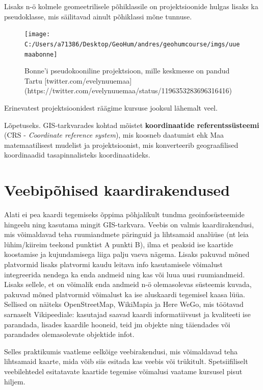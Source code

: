 \documentclass[
]{book}
\begin{document}
Lisaks n-ö kolmele geomeetrilisele põhiklassile on projektsioonide hulgas lisaks ka pseudoklasse, mis säilitavad ainult põhiklassi mõne tunnuse.

\begin{figure}

{\centering \texttt{[image: C:/Users/a71386/Desktop/GeoHum/andres/geohumcourse/imgs/uuemaabonne]} 

}

\caption{Bonne'i pseudokooniline projektsioon, mille keskmesse on pandud Tartu [twitter.com/evelynuuemaa](https://twitter.com/evelynuuemaa/status/1196353283696316416)}\label{fig:bonneprojection}
\end{figure}

Erinevatest projektsioonidest räägime kursuse jooksul lähemalt veel.

Lõpetuseks. GIS-tarkvarades kohtad mõistet \textbf{koordinaatide referentssüsteemi} (CRS - \emph{Coordinate reference system}), mis koosneb daatumist ehk Maa matemaatilisest mudelist ja projektsioonist, mis konverteerib geograafilised koordinaadid tasapinnalisteks koordinaatideks.

\hypertarget{veebipuxf5hised-kaardirakendused}{%
\section{Veebipõhised kaardirakendused}\label{veebipuxf5hised-kaardirakendused}}

Alati ei pea kaardi tegemiseks õppima põhjalikult tundma geoinfosüsteemide hingeelu ning kasutama mingit GIS-tarkvara. Veebis on valmis kaardirakendusi, mis võimaldavad teha ruumiandmete päringuid ja lihtsamaid analüüse (nt leia lühim/kiireim teekond punktist A punkti B), ilma et peaksid ise kaartide koostamise ja kujundamisega liiga palju vaeva nägema. Lisaks pakuvad mõned platvormid lisaks platvormi kaudu leitava info kasutamisele võimalust integreerida nendega ka enda andmeid ning kas või luua uusi ruumiandmeid. Lisaks sellele, et on võimalik enda andmeid n-ö olemasolevas süsteemis kuvada, pakuvad mõned platvormid võimalust ka ise aluskaardi tegemisel kaasa lüüa. Sellised on näiteks OpenStreetMap, WikiMapia ja Here WeGo, mis töötavad sarnaselt Vikipeediale: kasutajad saavad kaardi informatiivsust ja kvaliteeti ise parandada, lisades kaardile hooneid, teid jm objekte ning täiendades või parandades olemasolevate objektide infot.

Selles praktikumis vaatleme eelkõige veebirakendusi, mis võimaldavad teha lihtsamaid kaarte, mida võib siis esitada kas veebis või trükitult. Spetsiifiliselt veebilehtedel esitatavate kaartide tegemise võimalusi vaatame kursusel pisut hiljem.
\end{document}
